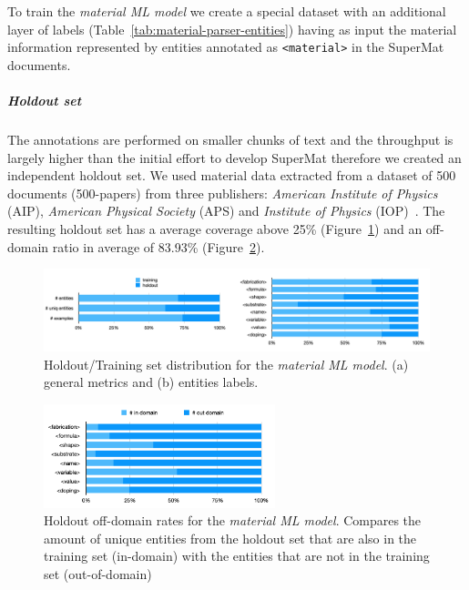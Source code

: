 \documentclass{article}
\begin{document}
To train the \textit{material ML model} we create a special dataset with an additional layer of labels (Table~\ref{tab:material-parser-entities}) having as input the material information represented by entities annotated as \texttt{<material>} in the SuperMat documents.

\subparagraph{Holdout set}
The annotations are performed on smaller chunks of text and the throughput is largely higher than the initial effort to develop SuperMat therefore we created an independent holdout set. 
We used material data extracted from a dataset of 500 documents (500-papers) from three publishers: \textit{American Institute of Physics} (AIP), \textit{American Physical Society} (APS) and \textit{Institute of Physics} (IOP)~\cite{foppiano2019proposal}.
The resulting holdout set has a average coverage above 25\% (Figure~\ref{fig:material-training-holdout-set-distribution}) and an off-domain ratio in average of 83.93\% (Figure~\ref{fig:material-out-domain-holdout}). 

\begin{figure}[ht]
\centering
\includegraphics[width=\textwidth]{material-holdout-training-set}
\caption{Holdout/Training set distribution for the \textit{material ML model}. (a) general metrics and (b) entities labels.}
\label{fig:material-training-holdout-set-distribution}
\end{figure}

\begin{figure}[ht]
\centering
\includegraphics[width=0.6\textwidth]{material-out-domain-holdout-unique}
\caption{Holdout off-domain rates for the \textit{material ML model}. Compares the amount of unique entities from the holdout set that are also in the training set (in-domain) with the entities that are not in the training set (out-of-domain)}
\label{fig:material-out-domain-holdout}
\end{figure}
\end{document}
